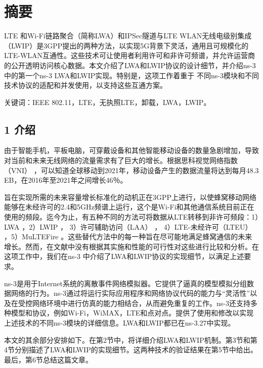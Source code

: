 


\chapter{摘要}
LTE 和Wi-Fi链路聚合（简称LWA）和IPSec隧道与LTE WLAN无线电级别集成（LWIP）是3GPP提出的两种方法，以实现5G背景下灵活，通用且可规模化的LTE-WLAN互通性。这些技术可让使用者利用许可和非许可频谱，并允许运营商的公开透明访问核心数据。本文介绍了LWA和LWIP协议的设计细节，并介绍ns-3中的第一个ns-3 LWA和LWIP实现。特别是，这项工作着重于
不同ns-3模块和不同技术协议的适配和并发使用，以支持这些互通方案。

关键词：IEEE 802.11，LTE，无执照LTE，卸载，LWA，LWIP。


\newpage
\section*{1 介绍}
由于智能手机，平板电脑，可穿戴设备和其他智能移动设备的数量急剧增加，导致对当前和未来无线网络的流量需求有了巨大的增长。根据思科视觉网络指数（VNI）
\cite{index2017global}
，可以知道全球移动到2021年，移动设备产生的数据流量将达到每月48.3 EB，在2016年至2021年之间增长46％。

旨在实现所需的未来容量增长标准化的动机正在3GPP上进行，以使蜂窝移动网络能够在未经许可的2.4和5GHz频谱上运行，这个是Wi-Fi和其他通信系统目前正在使用的频段。迄今为止，有五种不同的方法可将数据从LTE转移到非许可频段：1）LWA 
\cite{access2008and}，2）LWIP 
\cite{access2008and}，
3）许可辅助访问（LAA）
\cite{afaqui2019implementation}，
4）LTE-未经许可（LTEU）
\cite{U-LTE}
，5）MuLTEFire
\cite{alliance2017multefire}
。这些替代方法中的每一种旨在尽可能地满足蜂窝通信的未来增长。然而，在文献中没有根据其实施和性能的可行性对这些进行比较和分析。在这项工作中，我们在ns-3
\cite{Simulator}
中介绍了LWA和LWIP协议的实现细节，以满足上述要求。

ns-3是用于Internet系统的离散事件网络模拟器。它提供了逼真的模型模拟分组数据网络的行为。ns-3通过将运行实际应用程序和网络协议代码的能力与“灵活性”以及在受控网络环境中进行仿真的能力相结合，从而避免重复的工作。ns-3还支持多种模型和协议，例如Wi-Fi，WiMAX，LTE和点对点。提供了使用和修改以实现上述技术的不同ns-3模块的详细信息。LWA和LWIP都已在ns-3.27中实现。

本文的其余部分安排如下。在第2节中，将详细介绍LWA和LWIP机制。第3节和第4节分别描述了LWA和LWIP的实现细节。这两种技术的验证结果在第5节中给出。最后，第6节总结这篇文章。

